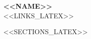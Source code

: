 \documentclass[letterpaper,11pt]{article}
\begin{document}
\begin{center}
    \textbf{\Huge <<NAME>>} \\ \vspace{5pt}
    \small <<LINKS_LATEX>>
    \vspace{-7pt}
  \end{center}


<<SECTIONS_LATEX>>


\end{document}
